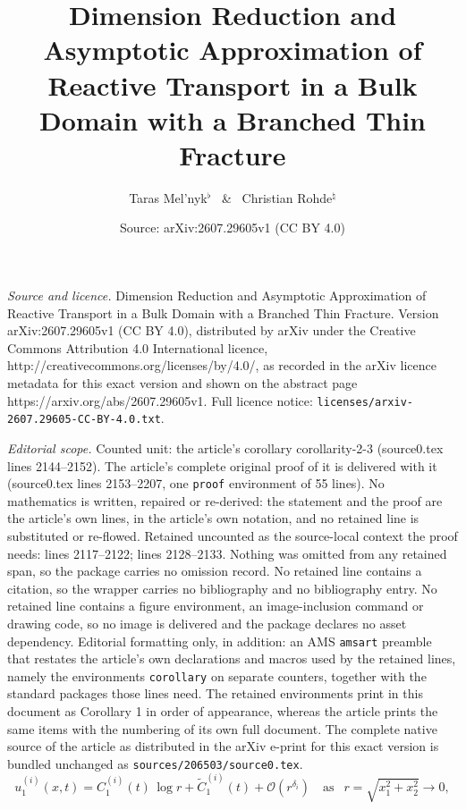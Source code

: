 \documentclass[10pt,a4paper]{amsart}
\title{Dimension Reduction and Asymptotic Approximation of Reactive Transport in a Bulk Domain with a Branched Thin Fracture}
\author{Taras Mel'nyk$^\flat$ \ \& \ Christian Rohde$^\natural$}
\date{Source: arXiv:2607.29605v1 (CC BY 4.0)}
\begin{document}
\maketitle

\noindent\emph{Source and licence.} Dimension Reduction and Asymptotic Approximation of Reactive Transport in a Bulk Domain with a Branched Thin Fracture. Version arXiv:2607.29605v1 (CC BY 4.0), distributed by arXiv under the Creative Commons Attribution 4.0 International licence, http://creativecommons.org/licenses/by/4.0/, as recorded in the arXiv licence metadata for this exact version and shown on the abstract page https://arxiv.org/abs/2607.29605v1. Full licence notice: \texttt{licenses/arxiv-2607.29605-CC-BY-4.0.txt}.\par\smallskip

\noindent\textit{Editorial scope.} Counted unit: the article's corollary corollarity-2-3 (source0.tex lines 2144--2152). The article's complete original proof of it is delivered with it (source0.tex lines 2153--2207, one \texttt{proof} environment of 55 lines). No mathematics is written, repaired or re-derived: the statement and the proof are the article's own lines, in the article's own notation, and no retained line is substituted or re-flowed.  Retained uncounted as the source-local context the proof needs: lines 2117--2122; lines 2128--2133.  Nothing was omitted from any retained span, so the package carries no omission record.  No retained line contains a citation, so the wrapper carries no bibliography and no bibliography entry.  No retained line contains a figure environment, an image-inclusion command or drawing code, so no image is delivered and the package declares no asset dependency.  Editorial formatting only, in addition: an AMS \texttt{amsart} preamble that restates the article's own declarations and macros used by the retained lines, namely the environments \texttt{corollary} on separate counters, together with the standard packages those lines need.  The retained environments print in this document as Corollary 1 in order of appearance, whereas the article prints the same items with the numbering of its own full document.  The complete native source of the article as distributed in the arXiv e-print for this exact version is bundled unchanged as \texttt{sources/206503/source0.tex}.
		\begin{equation}\label{asym-5}
			u^{(i)}_1(x,t)
			= C^{(i)}_1(t)\,\log r + \widetilde{C}^{(i)}_1(t)
			+ \mathcal{O}\!\left(r^{\delta_i}\right)
			\quad \text{as } \ \  r=\sqrt{x_1^2+x_2^2}\to 0,
		\end{equation}
\end{document}
